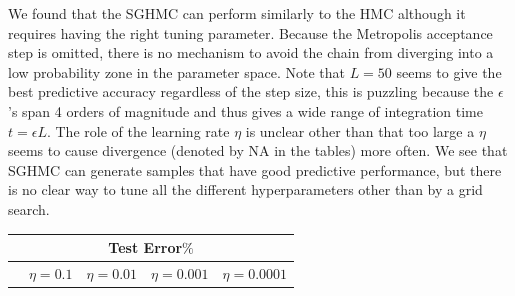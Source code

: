 \documentclass[12pt]{report}
\begin{document}
We found that the SGHMC can perform similarly to the HMC although it requires having the right tuning parameter. Because the Metropolis acceptance step is omitted, there is no mechanism to avoid the chain from diverging into a low probability zone in the parameter space. Note that $L=50$ seems to give the best predictive accuracy regardless of the step size, this is puzzling because the $\epsilon$'s span 4 orders of magnitude and thus gives a wide range of integration time $t = \epsilon L$. The role of the learning rate $\eta$ is unclear other than that too large a $\eta$ seems to cause divergence (denoted by NA in the tables) more often. We see that SGHMC can generate samples that have good predictive performance, but there is no clear way to tune all the different hyperparameters other than by a grid search. 


\begin{table}[]
\begin{minipage}{0.5\linewidth}
\centering
\footnotesize
\begin{tabular}{@{}lllll@{}}
\toprule
\multicolumn{5}{c}{Test Error$\%$}                  \\ \midrule
     & $\eta = 0.1$ & $\eta = 0.01$ & $\eta = 0.001$ & $\eta =0.0001$ \\ \midrule
     

\end{tabular}
\end{minipage}
\end{table}
\end{document}
